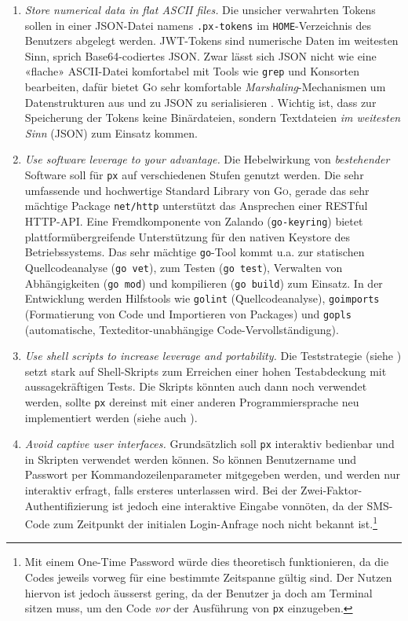 \begin{enumerate}
    \item \textit{Store numerical data in flat ASCII files.} Die unsicher verwahrten Tokens sollen in einer JSON-Datei namens \texttt{.px-tokens} im \texttt{HOME}-Verzeichnis des Benutzers abgelegt werden. JWT-Tokens sind numerische Daten im weitesten Sinn, sprich Base64-codiertes JSON. Zwar lässt sich JSON nicht wie eine «flache» ASCII-Datei komfortabel mit Tools wie \texttt{grep} und Konsorten bearbeiten, dafür bietet \textsc{Go} sehr komfortable \textit{Marshaling}-Mechanismen um Datenstrukturen aus und zu JSON zu serialisieren \cite[Kapitel 4.5]{gopl}. Wichtig ist, dass zur Speicherung der Tokens keine Binärdateien, sondern Textdateien \textit{im weitesten Sinn} (JSON) zum Einsatz kommen.
    \item \textit{Use software leverage to your advantage.} Die Hebelwirkung von \textit{bestehender} Software soll für \texttt{px} auf verschiedenen Stufen genutzt werden. Die sehr umfassende und hochwertige Standard Library von \textsc{Go}, gerade das sehr mächtige Package \texttt{net/http} unterstützt das Ansprechen einer RESTful HTTP-API. Eine Fremdkomponente von Zalando (\texttt{go-keyring}) bietet plattformübergreifende Unterstützung für den nativen Keystore des Betriebssystems. Das sehr mächtige \texttt{go}-Tool kommt u.a. zur statischen Quellcodeanalyse (\texttt{go vet}), zum Testen (\texttt{go test}), Verwalten von Abhängigkeiten (\texttt{go mod}) und kompilieren (\texttt{go build}) zum Einsatz. In der Entwicklung werden Hilfstools wie \texttt{golint} (Quellcodeanalyse), \texttt{goimports} (Formatierung von Code und Importieren von Packages) und \texttt{gopls} (automatische, Texteditor-unabhängige Code-Vervollständigung).
    \item \textit{Use shell scripts to increase leverage and portability.} Die Teststrategie (siehe ) setzt stark auf Shell-Skripts zum Erreichen einer hohen Testabdeckung mit aussagekräftigen Tests. Die Skripts könnten auch dann noch verwendet werden, sollte \texttt{px} dereinst mit einer anderen Programmiersprache neu implementiert werden (siehe auch ).
    \item \textit{Avoid captive user interfaces.} Grundsätzlich soll \texttt{px} interaktiv bedienbar und in Skripten verwendet werden können. So können Benutzername und Passwort per Kommandozeilenparameter mitgegeben werden, und werden nur interaktiv erfragt, falls ersteres unterlassen wird. Bei der Zwei-Faktor-Authentifizierung ist jedoch eine interaktive Eingabe vonnöten, da der SMS-Code zum Zeitpunkt der initialen Login-Anfrage noch nicht bekannt ist.\footnote{Mit einem One-Time Password würde dies theoretisch funktionieren, da die Codes jeweils vorweg für eine bestimmte Zeitspanne gültig sind. Der Nutzen hiervon ist jedoch äusserst gering, da der Benutzer ja doch am Terminal sitzen muss, um den Code \textit{vor} der Ausführung von \texttt{px} einzugeben.}

\end{enumerate}
